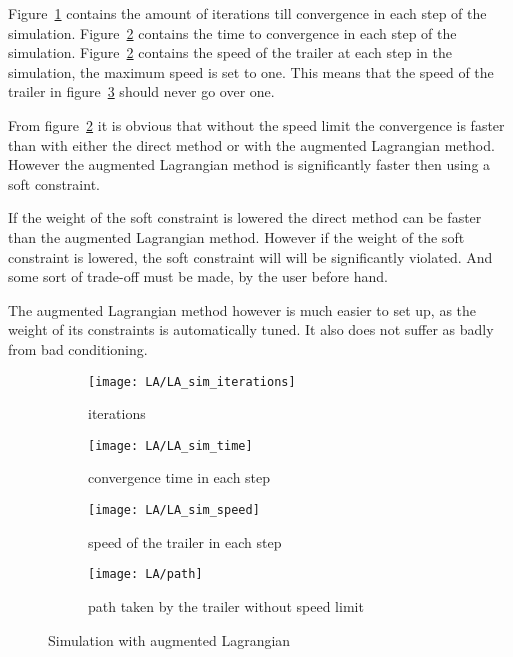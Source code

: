 Figure~\ref{fig:LA iterations} contains the amount of iterations till convergence in each step of the simulation. Figure~\ref{fig:LA time} contains the time to convergence in each step of the simulation. Figure~\ref{fig:LA time} contains the speed of the trailer at each step in the simulation, the maximum speed is set to one. This means that the speed of the trailer in figure~\ref{fig:LA speed} should never go over one.

From figure~\ref{fig:LA time} it is obvious that without the speed limit the convergence is faster than with either the direct method or with the augmented Lagrangian method. However the augmented Lagrangian method is significantly faster then using a soft constraint.

If the weight of the soft constraint is lowered the direct method can be faster than the augmented Lagrangian method. However if the weight of the soft constraint is lowered, the soft constraint will will be significantly violated. And some sort of trade-off must be made, by the user before hand.

The augmented Lagrangian method however is much easier to set up, as the weight of its constraints is automatically tuned. It also does not suffer as badly from bad conditioning.

\begin{figure}[H]
	\centering
	\begin{subfigure}[b]{0.45\textwidth}
		\centering
		\texttt{[image: LA/LA\_sim\_iterations]}
		\caption{iterations}
		\label{fig:LA iterations}
	\end{subfigure}
	\hfill
	\begin{subfigure}[b]{0.45\textwidth}
		\centering
		\texttt{[image: LA/LA\_sim\_time]}
		\caption{convergence time in each step}
		\label{fig:LA time}
	\end{subfigure}
	\begin{subfigure}[b]{0.45\textwidth}
		\centering
		\texttt{[image: LA/LA\_sim\_speed]}
		\caption{speed of the trailer in each step}
		\label{fig:LA speed}
	\end{subfigure}
	\hfill
	\begin{subfigure}[b]{0.45\textwidth}
		\centering
		\texttt{[image: LA/path]}
		\caption{path taken by the trailer without speed limit}
		\label{fig:LA path}
	\end{subfigure}
	\caption{Simulation with augmented Lagrangian}
	\label{fig:simulation with augmented Lagrangian}
\end{figure}
